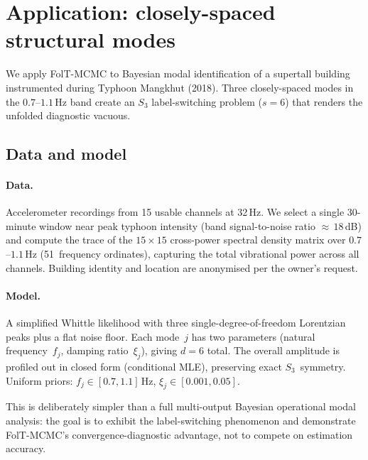 %  

\section{Application: closely-spaced structural modes}
\label{sec:application}

We apply FolT-MCMC to Bayesian modal identification of a
supertall building instrumented during Typhoon Mangkhut (2018).
Three closely-spaced modes in the $0.7$--$1.1$\,Hz band create
an $S_3$ label-switching problem ($s = 6$) that renders the
unfolded diagnostic vacuous.


\subsection{Data and model}
\label{sec:app_setup}

\paragraph{Data.}
Accelerometer recordings from 15 usable channels at 32\,Hz.
We select a single 30-minute window near peak typhoon intensity
(band signal-to-noise ratio ${\approx}\,18$\,dB) and compute
the trace of the $15 \times 15$ cross-power spectral density
matrix over $0.7$--$1.1$\,Hz (51~frequency ordinates),
capturing the total vibrational power across all channels.
Building identity and location are anonymised per the owner's
request.

\paragraph{Model.}
A simplified Whittle likelihood with three single-degree-of-freedom
Lorentzian peaks plus a flat noise floor.  Each mode~$j$ has two
parameters (natural frequency~$f_j$, damping ratio~$\xi_j$),
giving $d = 6$ total.  The overall amplitude is profiled out in
closed form (conditional MLE), preserving exact $S_3$~symmetry.
Uniform priors: $f_j \in [0.7, 1.1]$\,Hz,
$\xi_j \in [0.001, 0.05]$.

This is deliberately simpler than a full multi-output Bayesian
operational modal analysis: the goal is to exhibit the
label-switching phenomenon and demonstrate FolT-MCMC's
convergence-diagnostic advantage, not to compete on estimation accuracy.

